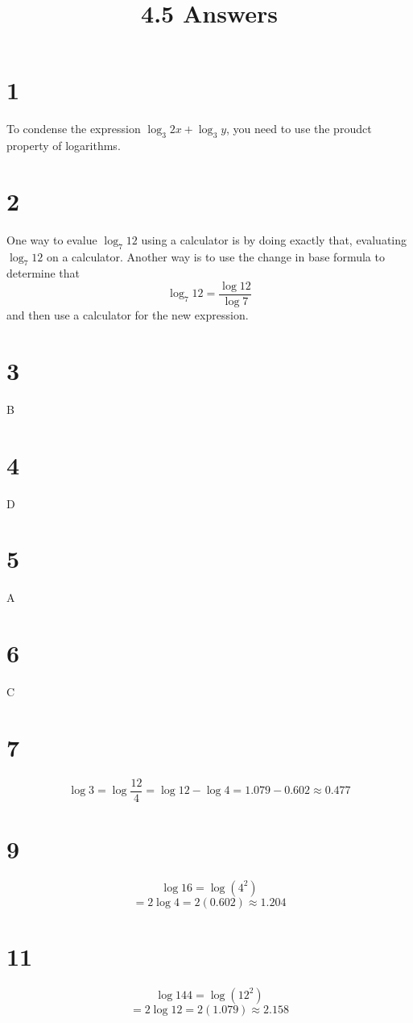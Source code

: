 \documentclass{article}
\title{4.5 Answers}
\theoremstyle{definition}
\newcommand{\?}{\stackrel{?}{=}}
\begin{document}
\maketitle

\section*{1}
To condense the expression $\log_3 2x+\log_3 y$, you need to use the proudct property of logarithms.

\section*{2}
One way to evalue $\log_7 12$ using a calculator is by doing exactly that, evaluating $\log_7 12$ on a calculator. Another way is to use the change in base formula 
to determine that \[ \log_7 12=\dfrac{\log 12}{\log 7} \] and then use a calculator for the new expression.

\section*{3}
B

\section*{4}
D

\section*{5}
A

\section*{6}
C

\section*{7}
\[ \log 3=\log{\frac{12}{4}}=\log 12-\log 4=1.079-0.602\approx 0.477 \]

\section*{9}
\[ \log 16=\log (4^2) \] \[ =2\log 4=2(0.602)\approx 1.204 \]

\section*{11}
\[ \log 144=\log (12^2) \] \[ =2\log 12=2(1.079)\approx 2.158 \]
\end{document}
